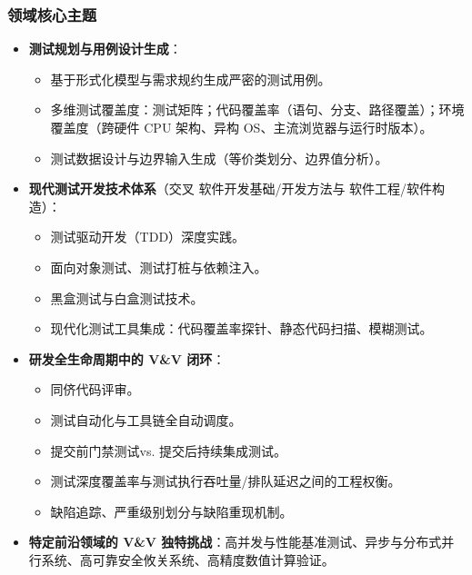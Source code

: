 \subsubsection{领域核心主题}
\begin{itemize}
    \item \textbf{测试规划与用例设计生成}：
    \begin{itemize}
        \item 基于形式化模型与需求规约生成严密的测试用例。
        \item 多维测试覆盖度：测试矩阵；代码覆盖率（语句、分支、路径覆盖）；环境覆盖度（跨硬件 CPU 架构、异构 OS、主流浏览器与运行时版本）。
        \item 测试数据设计与边界输入生成（等价类划分、边界值分析）。
    \end{itemize}
    \item \textbf{现代测试开发技术体系}（交叉 软件开发基础/开发方法与 软件工程/软件构造）：
    \begin{itemize}
        \item 测试驱动开发（TDD）深度实践。
        \item 面向对象测试、测试打桩与依赖注入。
        \item 黑盒测试与白盒测试技术。
        \item 现代化测试工具集成：代码覆盖率探针、静态代码扫描、模糊测试。
    \end{itemize}
    \item \textbf{研发全生命周期中的 V\&V 闭环}：
    \begin{itemize}
        \item 同侪代码评审。
        \item 测试自动化与工具链全自动调度。
        \item 提交前门禁测试vs. 提交后持续集成测试。
        \item 测试深度覆盖率与测试执行吞吐量/排队延迟之间的工程权衡。
        \item 缺陷追踪、严重级别划分与缺陷重现机制。
    \end{itemize}
    \item \textbf{特定前沿领域的 V\&V 独特挑战}：高并发与性能基准测试、异步与分布式并行系统、高可靠安全攸关系统、高精度数值计算验证。
\end{itemize}

